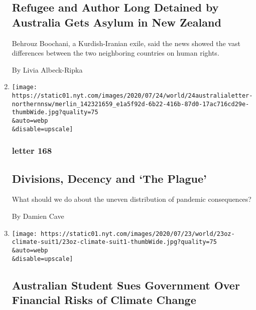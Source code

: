 \begin{enumerate}
  \hypertarget{refugee-and-author-long-detained-by-australia-gets-asylum-in-new-zealand}{%
  \subsection{Refugee and Author Long Detained by Australia Gets Asylum
  in New
  Zealand}\label{refugee-and-author-long-detained-by-australia-gets-asylum-in-new-zealand}}

  Behrouz Boochani, a Kurdish-Iranian exile, said the news showed the
  vast differences between the two neighboring countries on human
  rights.

  By Livia Albeck-Ripka
\item
  \href{/2020/07/24/world/australia/divisions-decency-and-the-plague.html}{}

  \texttt{[image: https://static01.nyt.com/images/2020/07/24/world/24australialetter-northernnsw/merlin\_142321659\_e1a5f92d-6b22-416b-87d0-17ac716cd29e-thumbWide.jpg?quality=75\\\&auto=webp\\\&disable=upscale]}

  \hypertarget{letter-168}{%
  \subsubsection{letter 168}\label{letter-168}}

  \hypertarget{divisions-decency-and-the-plague}{%
  \subsection{Divisions, Decency and `The
  Plague'}\label{divisions-decency-and-the-plague}}

  What should we do about the uneven distribution of pandemic
  consequences?

  By Damien Cave
\item
  \href{/2020/07/23/world/australia/lawsuit-climate-change-bonds.html}{}

  \texttt{[image: https://static01.nyt.com/images/2020/07/23/world/23oz-climate-suit1/23oz-climate-suit1-thumbWide.jpg?quality=75\\\&auto=webp\\\&disable=upscale]}

  \hypertarget{australian-student-sues-government-over-financial-risks-of-climate-change}{%
  \subsection{Australian Student Sues Government Over Financial Risks of
  Climate
  Change}\label{australian-student-sues-government-over-financial-risks-of-climate-change}}


\end{enumerate}
